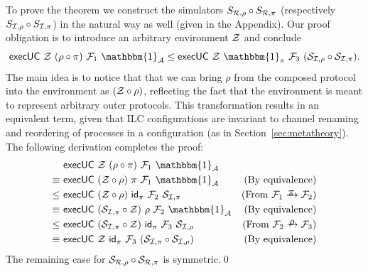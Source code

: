 \noindent \proof To prove the theorem we construct the simulators $S_{\mathcal{{R}},\rho} \circ S_{\mathcal{{R}},\pi}$ (respectively $S_{\mathcal{{I}},\rho} \circ S_{\mathcal{{I,\pi}}}$) in the natural way as well (given in the Appendix).
Our proof obligation is to introduce an arbitrary environment $\mathcal{{Z}}$ and conclude
\[  \keyword{execUC}~\mc{Z} ~(\rho \circ \pi)~\mc{F}_1 ~\mathbbm{1}_\mc{A}
\le \keyword{execUC}~\mc{Z} ~\mathbbm{1}_\mc{\pi} ~\mc{F}_3 ~(\mc{S}_{\mc{I},\rho} \circ \mc{S}_{\mc{I},\pi})
.\]
\noindent
%
The main idea is to notice that that we can bring $\rho$ from the composed protocol into the environment as $(\mathcal{{Z}}\circ \rho)$, reflecting the fact that the environment is meant to represent arbitrary outer protocols. This transformation results in an equivalent term, given that ILC configurations are invariant to channel renaming and reordering of processes in a configuration (as in Section~\ref{sec:metatheory}).
The following derivation completes the proof:
\begin{align*}
    &~ \keyword{execUC}~\mc{Z}~(\rho \circ \pi)~\mc{F}_1~ \mathbbm{1}_\mc{A} & \\
  \equiv &~ \keyword{execUC}~(\mc{Z}\circ \rho)~\pi~\mc{F}_1~ \mathbbm{1}_\mc{A} &
  \textnormal{(By equivalence)} \\
\le&~ \keyword{execUC}~(\mc{Z}\circ \rho)~\mathsf{id}_\pi ~\mc{F}_2~ \mc{S}_{\mc{I},\pi} & (\textnormal{From}~ \mc{F}_1 \yrightarrow{$\pi$} \mc{F}_2) \\
 \equiv &~ \keyword{execUC}~(\mc{S}_{\mc{I},\pi}\circ \mc{Z})~\rho ~\mc{F}_2~ \mathbbm{1}_\mc{A} &  \textnormal{(By equivalence)} \\
\le&~ \keyword{execUC}~(\mc{S}_{\mc{I},\pi}\circ\mc{Z})~\mathsf{id}_\pi~\mc{F}_3~\mc{S}_{\mc{I},\rho} &
(\textnormal{From}~ \mc{F}_2 \yrightarrow{$\rho$} \mc{F}_3) \\
\equiv &~ \keyword{execUC}~\mc{Z}~ \mathsf{id}_\pi~ \mc{F}_3~ (\mc{S}_{\mc{I},\pi} \circ \mc{S}_{\mc{I},\rho}) &
\textnormal{(By equivalence)}
\end{align*}
The remaining case for $\mathcal{{S}}_{\mathcal{{R}},\rho} \circ \mathcal{{S}}_{\mathcal{{R}},\pi}$ is symmetric.\qed
